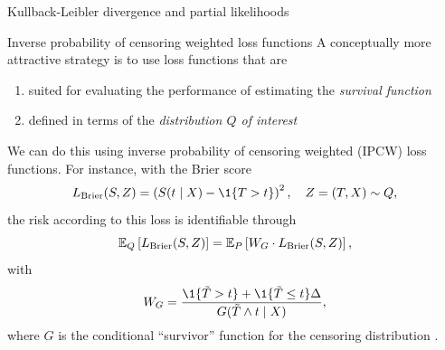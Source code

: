 \documentclass[smaller]{beamer}\usepackage{listings}
\begin{document}
\begin{frame}[label={sec:org1d43bb0}]{Kullback-Leibler divergence and partial likelihoods}
\begin{onlyenv}
\vfill

\end{onlyenv}
\end{frame}


\begin{frame}[label={sec:org51aaf5c}]{Inverse probability of censoring weighted loss functions}
\small A conceptually more attractive strategy is to use loss functions that are
\begin{enumerate}[{(i)}]
\item suited for evaluating the performance of estimating the \emph{survival function}
\item defined in terms of the \emph{distribution \(Q\) of interest}
\end{enumerate}

\vfill

We can do this using inverse probability of censoring weighted (IPCW) loss functions. For instance,
with the Brier score
\begin{equation*}
  L_{\mathrm{Brier}}(S, Z) = 
  \left(
    S(t \mid X) - \1
    {\left\{
        T > t
      \right\}}
  \right)^2,
  \quad Z = (T, X) \sim Q,
\end{equation*}
the risk according to this loss is identifiable through
\begin{equation*}
  \operatorname{\mathbb{E}}_Q\left[ L_{\mathrm{Brier}}(S, Z) \right]
  = \operatorname{\mathbb{E}}_P\left[W_G \cdot L_{\mathrm{Brier}}(S, Z) \right],
\end{equation*}
with
\begin{equation*}
  W_G = \frac{\1{\{\tilde T > t\}} + \1{\{\tilde T \leq t\}}\Delta}{G(\tilde T \wedge t \mid X)},
\end{equation*}
where \(G\) is the conditional ``survivor'' function for the censoring distribution
\citep{graf1999assessment,gerds2006consistent,van2003unicv}.
\end{frame}
\end{document}
